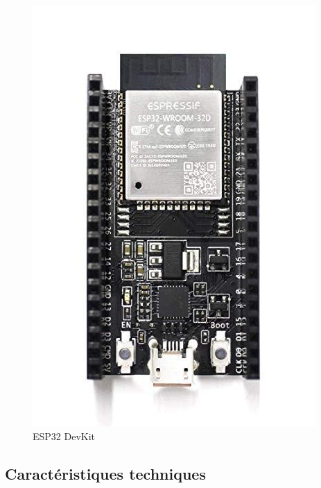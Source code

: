 \begin{figure}[h!]
    \centering
    \includegraphics[scale=0.30]{images/esp32.jpg}
    \caption{ESP32 DevKit}
    \label{fig49}
\end{figure}

\subsection{Caractéristiques techniques}

